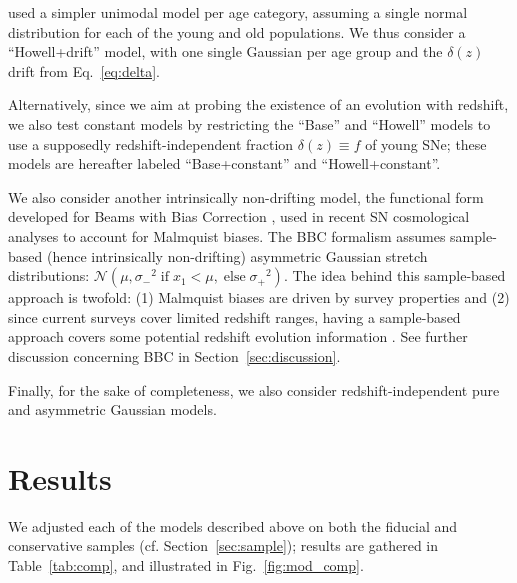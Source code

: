 \documentclass[referee]{aa}
\begin{document}
\cite{howell2007} used a simpler unimodal model per age category, assuming a
single normal distribution for each of the young and old populations. We thus
consider a ``Howell+drift'' model, with one single Gaussian per age group and
the $\delta(z)$ drift from Eq.~\ref{eq:delta}.

Alternatively, since we aim at probing the existence of an evolution with
redshift, we also test constant models by restricting the ``Base'' and
``Howell'' models to use a supposedly redshift-independent fraction $\delta(z)
\equiv f$ of young SNe; these models are hereafter labeled ``Base+constant'' and
``Howell+constant''.

We also consider another intrinsically non-drifting model, the functional form
developed for Beams with Bias Correction \cite[BBC,][]{scolnic2016,
kessler2017}, used in recent SN cosmological analyses
\cite[e.g.][]{scolnic2018a, descosmopaper2019, riess2016, riess2019} to account
for Malmquist biases. The BBC formalism assumes sample-based (hence
intrinsically non-drifting) asymmetric Gaussian stretch distributions:
$\mathcal{N}\left(\mu, \sigma_-{}^2\; \text{if} \;x_1<\mu,\; \text{else}
\;\sigma_+{}^2\right)$. The idea behind this sample-based approach is twofold:
(1) Malmquist biases are driven by survey properties and (2) since current
surveys cover limited redshift ranges, having a sample-based approach covers
some potential redshift evolution information \citep{scolnic2016, scolnic2018a}.
See further discussion concerning BBC in Section~\ref{sec:discussion}. 

Finally, for the sake of completeness, we also consider redshift-independent
pure and asymmetric Gaussian models. 

\section{Results}\label{sec:results}

We adjusted each of the models described above on both the fiducial and
conservative samples (cf. Section~\ref{sec:sample}); results are gathered
in Table~\ref{tab:comp}, and illustrated in Fig.~\ref{fig:mod_comp}. 
\end{document}
